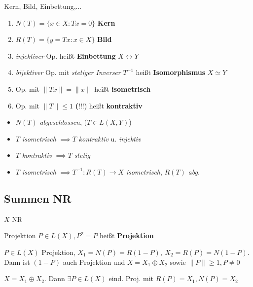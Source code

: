 \begin{definition}{Kern, Bild, Einbettung,...}
  \begin{enumerate}[label = (\roman*)]
    \item $N(T) = \{x \in X: Tx =0\}$ \textbf{Kern}
    \item $R(T) = \{y = Tx: x \in X\}$ \textbf{Bild}
    \item \textit{injektiver} Op. heißt \textbf{Einbettung}
      $X \leftrightarrow Y$
    \item \textit{bijektiver} Op. mit \textit{stetiger Inverser} $T^{-1}$
     heißt \textbf{Isomorphismus} $X \simeq Y$
    \item Op. mit $\|Tx\| = \|x\|$ heißt \textbf{isometrisch}
    \item Op. mit $\|T\| \leq 1$ \textbf(!!!) heißt \textbf{kontraktiv}
  \end{enumerate}
\end{definition}

\begin{bemerkung}
  \begin{itemize}
    \item $N(T)$ \textit{abgeschlossen}, ($T\in L(X,Y)$)
    \item $T$ \textit{isometrisch} $\implies T$ \textit{kontraktiv} u.
      \textit{injektiv}
    \item $T$ \textit{kontraktiv} $\implies T$ \textit{stetig}
    \item $T$ \textit{isometrisch} $\implies T^{-1}:R(T) \to X$
      \textit{isometrisch}, $R(T)$ \textit{abg.}
  \end{itemize}
\end{bemerkung}


\subsection{Summen NR}
  $X$ NR

\begin{definition}{Projektion}
  $P \in L(X), P^2=P$ heißt \textbf{Projektion}
\end{definition}

\begin{lemma}
  $P \in L(X)$ Projektion, $X_1 = N(P) = R(1-P),\ X_2 = R(P) = N(1-P)$.
  Dann ist $(1-P)$ auch Projektion und $X = X_1 \oplus X_2$ sowie
  $\|P\| \geq 1, P \neq 0$
\end{lemma}

\begin{lemma}
  $X = X_1 \oplus X_2$. Dann $\exists P \in L(X)$ eind. Proj. mit
  $R(P) = X_1, N(P) = X_2$
\end{lemma}


